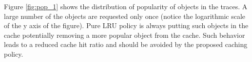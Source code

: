 Figure \ref{fig:pop_1} shows the distribution of popularity of objects in the traces. A large number of the objects are requested only once (notice the logarithmic scale of the y axis of the figure). Pure LRU policy is always putting such objects in the cache potentially removing a more popular object from the cache. Such behavior leads to a reduced cache hit ratio and should be avoided by the proposed caching policy.

